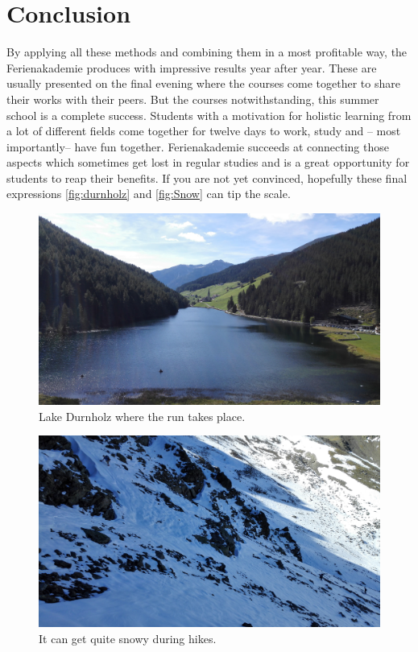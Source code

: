 \section{Conclusion}
By applying all these methods and combining them in a most profitable way, the Ferienakademie produces with impressive results year after year. These are usually presented on the final evening where the courses come together to share their works with their peers. But the courses notwithstanding, this summer school is a complete success. Students with a motivation for holistic learning from a lot of different fields come together for twelve days to work, study and -- most importantly-- have fun together. Ferienakademie succeeds at connecting those aspects which sometimes get lost in regular studies and is a great opportunity for students to reap their benefits. If you are not yet convinced, hopefully these final expressions \autoref{fig:durnholz} and \autoref{fig:Snow} can tip the scale.
\begin{figure}[ht]%
 	\begin{center}%
 		\includegraphics[scale=0.045]{img/Durnholz.jpg}%
 		\caption{Lake Durnholz where the run takes place.}\label{fig:durnholz}%
 	\end{center}%
\end{figure}
\begin{figure}[ht]%
 	\begin{center}%
 		\includegraphics[scale=0.045]{img/Snow.jpg}%
 		\caption{It can get quite snowy during hikes.}\label{fig:Snow}%
 	\end{center}%
\end{figure}
